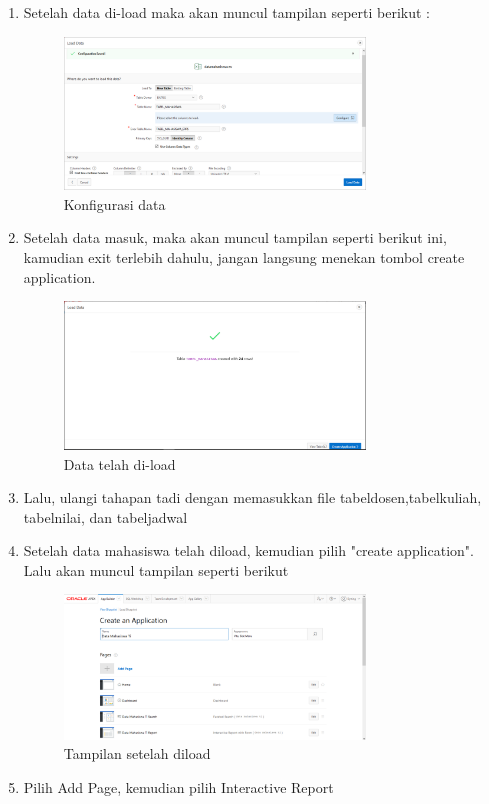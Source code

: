 \begin{enumerate}
	\item Setelah data di-load maka akan muncul tampilan seperti berikut :
		        \begin{figure}[H]
				\includegraphics[width=8cm]{figures/loadnpm.PNG}
				\centering
				\caption{Konfigurasi data}
				\end{figure}
	\item Setelah data masuk, maka akan muncul tampilan seperti berikut ini, kamudian exit terlebih dahulu, jangan langsung menekan tombol create application.
				\begin{figure}[H]
				\includegraphics[width=8cm]{figures/setelahload.PNG}
				\centering
				\caption{Data telah di-load}
				\end{figure}
	\item Lalu, ulangi tahapan tadi dengan memasukkan file tabeldosen,tabelkuliah, tabelnilai, dan tabeljadwal
	\item Setelah data mahasiswa telah diload, kemudian pilih "create application". Lalu akan muncul tampilan seperti berikut
				\begin{figure}[H]
				\includegraphics[width=8cm]{figures/createap.png}
				\centering
				\caption{Tampilan setelah diload}
				\end{figure}
	\item Pilih Add Page, kemudian pilih Interactive Report

\end{enumerate}
